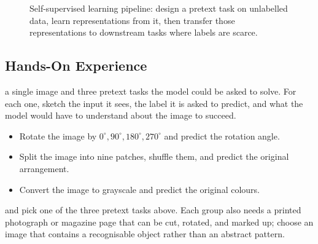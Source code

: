 \begin{figure}
\centering
{}
\caption{Self-supervised learning pipeline: design a pretext task on unlabelled data, learn representations from it, then transfer those representations to downstream tasks where labels are scarce.}
\label{fig:ssl_pipeline}
\end{figure}

\subsection{Hands-On Experience}

 a single image and three pretext tasks the model could be asked to solve. For each one, sketch the input it sees, the label it is asked to predict, and what the model would have to understand about the image to succeed.

\begin{itemize}
    \item Rotate the image by $0^\circ, 90^\circ, 180^\circ, 270^\circ$ and predict the rotation angle.
    \item Split the image into nine patches, shuffle them, and predict the original arrangement.
    \item Convert the image to grayscale and predict the original colours.
\end{itemize}


 and pick one of the three pretext tasks above. Each group also needs a printed photograph or magazine page that can be cut, rotated, and marked up; choose an image that contains a recognisable object rather than an abstract pattern.

